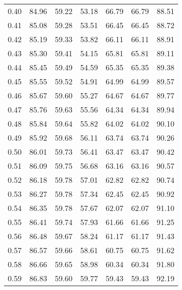 \begin{tabular}{|c|c|c|c|c|c|c|}
      0.40 &     84.96 &     59.22 &      53.18 &   66.79 &      66.79 &         88.51 \\
      0.41 &     85.08 &     59.28 &      53.51 &   66.45 &      66.45 &         88.72 \\
      0.42 &     85.19 &     59.33 &      53.82 &   66.11 &      66.11 &         88.91 \\
      0.43 &     85.30 &     59.41 &      54.15 &   65.81 &      65.81 &         89.11 \\
      0.44 &     85.45 &     59.49 &      54.59 &   65.35 &      65.35 &         89.38 \\
      0.45 &     85.55 &     59.52 &      54.91 &   64.99 &      64.99 &         89.57 \\
      0.46 &     85.67 &     59.60 &      55.27 &   64.67 &      64.67 &         89.77 \\
      0.47 &     85.76 &     59.63 &      55.56 &   64.34 &      64.34 &         89.94 \\
      0.48 &     85.84 &     59.64 &      55.82 &   64.02 &      64.02 &         90.10 \\
      0.49 &     85.92 &     59.68 &      56.11 &   63.74 &      63.74 &         90.26 \\
      0.50 &     86.01 &     59.73 &      56.41 &   63.47 &      63.47 &         90.42 \\
      0.51 &     86.09 &     59.75 &      56.68 &   63.16 &      63.16 &         90.57 \\
      0.52 &     86.18 &     59.78 &      57.01 &   62.82 &      62.82 &         90.74 \\
      0.53 &     86.27 &     59.78 &      57.34 &   62.45 &      62.45 &         90.92 \\
      0.54 &     86.35 &     59.78 &      57.67 &   62.07 &      62.07 &         91.10 \\
      0.55 &     86.41 &     59.74 &      57.93 &   61.66 &      61.66 &         91.25 \\
      0.56 &     86.48 &     59.67 &      58.24 &   61.17 &      61.17 &         91.43 \\
      0.57 &     86.57 &     59.66 &      58.61 &   60.75 &      60.75 &         91.62 \\
      0.58 &     86.66 &     59.65 &      58.98 &   60.34 &      60.34 &         91.80 \\
      0.59 &     86.83 &     59.60 &      59.77 &   59.43 &      59.43 &         92.19 \\

\end{tabular}
